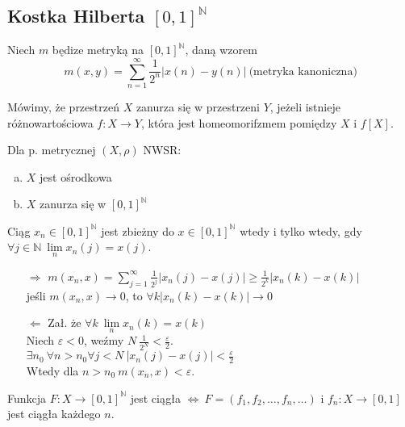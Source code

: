 \subsection{Kostka Hilberta $[0,1]^\mathbb{N}$}
    Niech $m$ będize metryką na $[0,1]^\mathbb{N}$, daną wzorem 
    \[ m(x,y) = \sum_{n=1}^\infty \frac{1}{2^n} |x(n) - y(n)| \ \text{(metryka kanoniczna)}\]
\begin{df} 
    Mówimy, że przestrzeń $X$ zanurza się w przestrzeni $Y$, jeżeli istnieje różnowartościowa
    $f: X \to Y$, która jest homeomorifzmem pomiędzy $X$ i $f[X]$.
\end{df} 
\begin{tw} 
    Dla p. metrycznej $(X,\rho)$ NWSR: 
    \begin{enumerate}[(a)]
        \item $X$ jest ośrodkowa 
        \item $X$ zanurza się w $[0,1]^\mathbb{N}$
    \end{enumerate} 
\end{tw} 
\begin{lem} 
    Ciąg $x_n \in [0,1]^\mathbb{N}$ jest zbieżny do $x \in [0,1]^\mathbb{N}$ wtedy i tylko wtedy, gdy 
    $\forall j \in \mathbb{N} \ \lim\limits_{n} x_n(j) = x(j)$.
    \begin{dd} \hfill 
        \begin{itemize} 
            \item[$\Rightarrow$] $m(x_n,x) = \sum\limits_{j=1}^\infty \frac{1}{2^j} |x_n(j) - x(j)| 
                    \ge \frac{1}{2^k} |x_n(k) - x(k)|$ \\ 
                    jeśli $m(x_n,x) \to 0$, to $ \forall k |x_n (k) - x(k)| \to 0$
                \item[$\Leftarrow$] Zał. że $\forall k \ \lim\limits_n x_n (k) = x(k)$ \\ 
                    Niech $\varepsilon < 0$, weźmy $N \ \frac{1}{2^N} < \frac{\varepsilon}{2}$. \\ 
                    $\exists n_0 \ \forall n > n_0 \forall j < N \ |x_n(j) - x(j)| < \frac{\varepsilon}{2}$ \\ 
                    Wtedy dla $n > n_0 \ m(x_n,x) < \varepsilon$.
        \end{itemize} 
    \end{dd} 
\end{lem}
\begin{uw} 
    Funkcja $F: X \to [0,1]^\mathbb{N}$ jest ciągła $\Leftrightarrow \ F=(f_1,f_2,\ldots,f_n,\ldots)$ i 
    $f_n : X \to [0,1]$ jest ciągła każdego $n$.
\end{uw} 
